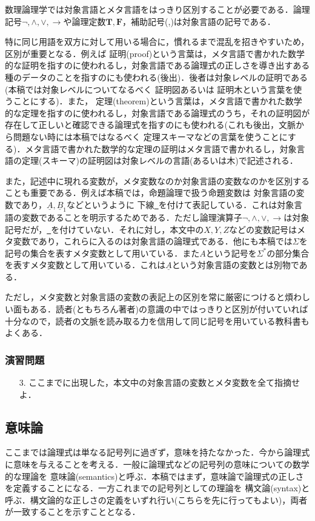 \documentclass{ltjsarticle}
\theoremstyle{mystyle1}
\theoremstyle{mystyle3}
\theoremstyle{mystyle2}
\newcommand{\uA}{\underline{A}}
\newcommand{\uB}{\underline{B}}
\newcommand{\bT}{\ensuremath{\mathbf{T}}}
\newcommand{\bF}{\ensuremath{\mathbf{F}}}
\newcommand{\red}[1]{{\color{red} #1}}
\begin{document}
数理論理学では対象言語とメタ言語をはっきり区別することが必要である．論理記号$\neg,\wedge,\vee,\to$や論理定数$\bT,\bF$，補助記号(,)は対象言語の記号である．

特に同じ用語を双方に対して用いる場合に，慣れるまで混乱を招きやすいため，区別が重要となる．例えば\red{証明}(proof)という言葉は，メタ言語で書かれた数学的な証明を指すのに使われるし，対象言語である論理式の正しさを導き出すある種のデータのことを指すのにも使われる(後出)．後者は対象レベルの証明である(本稿では対象レベルについてなるべく\red{証明図}あるいは\red{証明木}という言葉を使うことにする)．また，\red{定理}(theorem)という言葉は，メタ言語で書かれた数学的な定理を指すのに使われるし，対象言語である論理式のうち，それの証明図が存在して正しいと確認できる論理式を指すのにも使われる(これも後出，文脈から問題ない時には本稿ではなるべく\red{定理スキーマ}などの言葉を使うことにする)．メタ言語で書かれた数学的な定理の証明はメタ言語で書かれるし，対象言語の定理(スキーマ)の証明図は対象レベルの言語(あるいは木)で記述される．

また，記述中に現れる変数が，メタ変数なのか対象言語の変数なのかを区別することも重要である．例えば本稿では，命題論理で扱う命題変数は 対象言語の変数であり，$\uA,\uB_1$などというように 下線\underline{\ }を付けて表記している．これは対象言語の変数であることを明示するためである．ただし論理演算子$\neg,\wedge,\vee,\to$は対象記号だが，\underline{\ }を付けていない．それに対し，本文中の$X,Y,Z$などの変数記号はメタ変数であり，これらに入るのは対象言語の論理式である．他にも本稿では$\Sigma$を記号の集合を表すメタ変数として用いている．また$A$という記号を$\Sigma^\ast$の部分集合を表すメタ変数として用いている．これは$\uA$という対象言語の変数とは別物である．

ただし，メタ変数と対象言語の変数の表記上の区別を常に厳密につけると煩わしい面もある．読者(ともちろん著者)の意識の中ではっきりと区別が付いていれば十分なので，読者の文脈を読み取る力を信用して同じ記号を用いている教科書もよくある．
\subsubsection*{演習問題}
\begin{enumerate}
  \setcounter{enumi}{2}
  \item[3.] ここまでに出現した，本文中の対象言語の変数とメタ変数を全て指摘せよ．
\end{enumerate}
\subsection{意味論}
ここまでは論理式は単なる記号列に過ぎず，意味を持たなかった．今から論理式に意味を与えることを考える．一般に論理式などの記号列の意味についての数学的な理論を\red{意味論}(semantics)と呼ぶ．本稿ではまず，意味論で論理式の正しさを定義することになる．一方これまでの記号列としての理論を\red{構文論}(syntax)と呼ぶ．構文論的な正しさの定義をいずれ行い(こちらを先に行ってもよい)，両者が一致することを示すこととなる．
\end{document}
